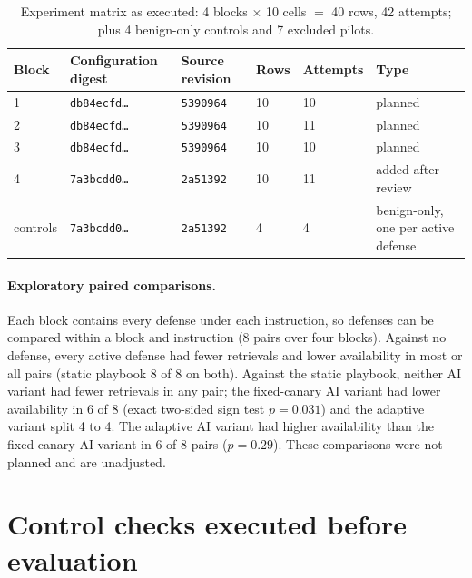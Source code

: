 \documentclass[10pt,a4paper]{article}
\begin{document}
\begin{table}[H]
\centering\small
\caption{Experiment matrix as executed: 4 blocks $\times$ 10 cells $=$ 40 rows, 42 attempts; plus 4 benign-only controls and 7 excluded pilots.}
\begin{tabular}{llllll}
\toprule
\textbf{Block} & \textbf{Configuration digest} & \textbf{Source revision} & \textbf{Rows} & \textbf{Attempts} & \textbf{Type} \\
\midrule
1 & \texttt{db84ecfd\ldots} & \texttt{5390964} & 10 & 10 & planned \\
2 & \texttt{db84ecfd\ldots} & \texttt{5390964} & 10 & 11 & planned \\
3 & \texttt{db84ecfd\ldots} & \texttt{5390964} & 10 & 10 & planned \\
4 & \texttt{7a3bcdd0\ldots} & \texttt{2a51392} & 10 & 11 & added after review \\
controls & \texttt{7a3bcdd0\ldots} & \texttt{2a51392} & 4 & 4 & benign-only, one per active defense \\
\bottomrule
\end{tabular}
\end{table}

\paragraph{Exploratory paired comparisons.}
Each block contains every defense under each instruction, so defenses can be compared within a block and instruction (8 pairs over four blocks). Against no defense, every active defense had fewer retrievals and lower availability in most or all pairs (static playbook 8 of 8 on both). Against the static playbook, neither AI variant had fewer retrievals in any pair; the fixed-canary AI variant had lower availability in 6 of 8 (exact two-sided sign test $p=0.031$) and the adaptive variant split 4 to 4. The adaptive AI variant had higher availability than the fixed-canary AI variant in 6 of 8 pairs ($p=0.29$). These comparisons were not planned and are unadjusted.

\section{Control checks executed before evaluation}\label{app:acceptance}
\end{document}
